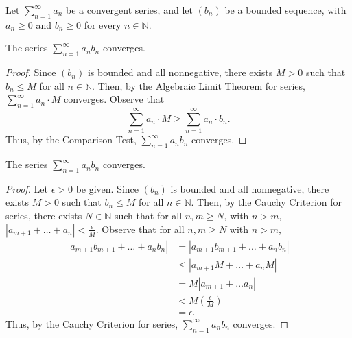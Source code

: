 \documentclass[12pt]{article}
\begin{document}
\newpage
{} Let $\sum\limits_{n=1}^\infty a_n$ be a convergent series, and let $(b_n)$ be a bounded sequence, with $a_n \geq 0$ and $b_n \geq 0$ for every $n \in \mathbb N$.

\medskip
{} The series $\sum\limits_{n=1}^\infty a_n b_n$ converges.
\begin{proof}
    Since $(b_n)$ is bounded and all nonnegative, there exists $M > 0$ such that $b_n \leq M$ for all $n \in \mathbb N$. Then, by the Algebraic Limit Theorem for series, $\sum\limits_{n=1}^\infty a_n \cdot M$ converges. Observe that $$\sum\limits_{n=1}^\infty a_n \cdot M \geq \sum\limits_{n=1}^\infty a_n \cdot b_n.$$ Thus, by the Comparison Test, $\sum\limits_{n=1}^\infty a_n b_n$ converges.
\end{proof}

\medskip
{} The series $\sum\limits_{n=1}^\infty a_n b_n$ converges.
\begin{proof}
    Let $\epsilon > 0$ be given. Since $(b_n)$ is bounded and all nonnegative, there exists $M > 0$ such that $b_n \leq M$ for all $n \in \mathbb N$. Then, by the Cauchy Criterion for series, there exists $N \in \mathbb N$ such that for all $n,m \geq N$, with $n > m$, $|a_{m+1} + \hdots + a_n| < \frac\epsilon M$. Observe that for all $n,m \geq N$ with $n > m$,
    \begin{align*}
        |a_{m+1}b_{m+1} + \hdots + a_n b_n| &= |a_{m+1}b_{m+1} + \hdots + a_n b_n| \\
                                            &\leq |a_{m+1}M + \hdots + a_nM| \\
                                            &= M|a_{m+1} + \hdots a_n| \\
                                            &< M\left(\frac\epsilon M\right) \\
                                            &= \epsilon.
    \end{align*} Thus, by the Cauchy Criterion for series, $\sum\limits_{n=1}^\infty a_n b_n$ converges.
\end{proof}
    
\end{document}
